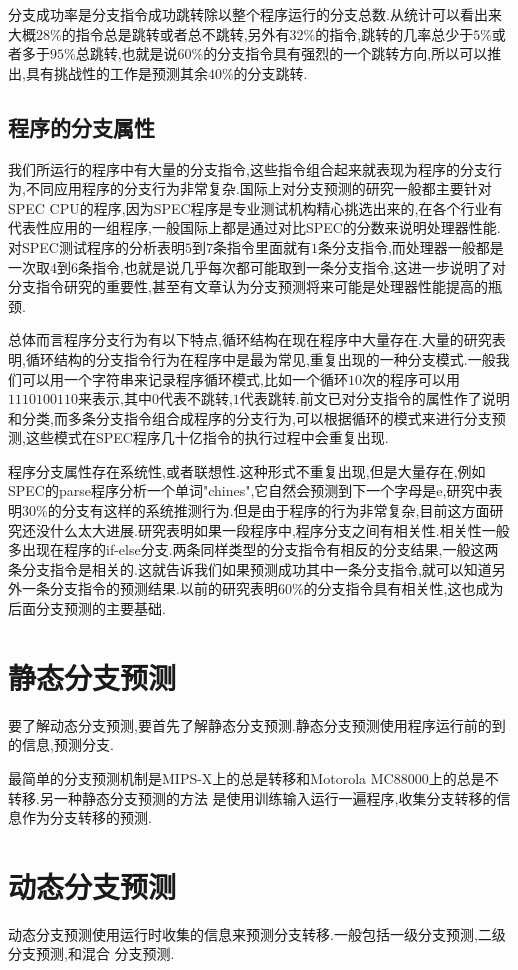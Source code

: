 \documentclass[adobefonts, nocap]{ctexart}
\begin{document}
      分支成功率是分支指令成功跳转除以整个程序运行的分支总数.从统计可以看出来大概$28\%$的指令总是跳转或者总不跳转,另外有$32\%$的指令,跳转的几率总少于$5\%$或者多于$95\%$总跳转,也就是说$60\%$的分支指令具有强烈的一个跳转方向,所以可以推出,具有挑战性的工作是预测其余$40\%$的分支跳转.
    \subsection{程序的分支属性}
      我们所运行的程序中有大量的分支指令,这些指令组合起来就表现为程序的分支行为,不同应用程序的分支行为非常复杂.国际上对分支预测的研究一般都主要针对SPEC CPU的程序,因为SPEC程序是专业测试机构精心挑选出来的,在各个行业有代表性应用的一组程序,一般国际上都是通过对比SPEC的分数来说明处理器性能.对SPEC测试程序的分析表明$5$到$7$条指令里面就有$1$条分支指令,而处理器一般都是一次取$4$到$6$条指令,也就是说几乎每次都可能取到一条分支指令,这进一步说明了对分支指令研究的重要性,甚至有文章认为分支预测将来可能是处理器性能提高的瓶颈.

      总体而言程序分支行为有以下特点,循环结构在现在程序中大量存在.大量的研究表明,循环结构的分支指令行为在程序中是最为常见,重复出现的一种分支模式.一般我们可以用一个字符串来记录程序循环模式,比如一个循环$10$次的程序可以用$1110100110$来表示,其中$0$代表不跳转,$1$代表跳转.前文已对分支指令的属性作了说明和分类,而多条分支指令组合成程序的分支行为,可以根据循环的模式来进行分支预测,这些模式在SPEC程序几十亿指令的执行过程中会重复出现.

      程序分支属性存在系统性,或者联想性.这种形式不重复出现,但是大量存在,例如SPEC的parse程序分析一个单词"chines",它自然会预测到下一个字母是e,研究中表明$30\%$的分支有这样的系统推测行为.但是由于程序的行为非常复杂,目前这方面研究还没什么太大进展.研究表明如果一段程序中,程序分支之间有相关性.相关性一般多出现在程序的if-else分支.两条同样类型的分支指令有相反的分支结果,一般这两条分支指令是相关的.这就告诉我们如果预测成功其中一条分支指令,就可以知道另外一条分支指令的预测结果.以前的研究表明$60\%$的分支指令具有相关性,这也成为后面分支预测的主要基础.
  \section{静态分支预测}
    要了解动态分支预测,要首先了解静态分支预测.静态分支预测使用程序运行前的到的信息,预测分支.

    最简单的分支预测机制是MIPS-X上的总是转移和Motorola MC88000上的总是不转移.另一种静态分支预测的方法
    是使用训练输入运行一遍程序,收集分支转移的信息作为分支转移的预测.
  \section{动态分支预测}
    动态分支预测使用运行时收集的信息来预测分支转移.一般包括一级分支预测,二级分支预测,和混合
    分支预测.
\end{document}
